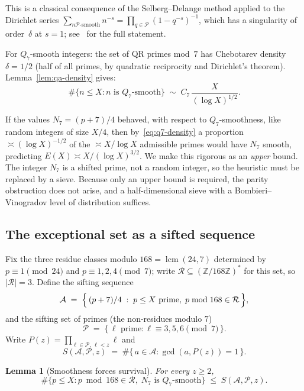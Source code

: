 \documentclass[12pt]{amsart}
\newtheorem{lemma}[theorem]{Lemma}
\theoremstyle{definition}
\theoremstyle{remark}
\begin{document}
This is a classical consequence of the Selberg--Delange method applied
to the Dirichlet series
$\sum_{n \mathcal{P}\text{-smooth}} n^{-s}
= \prod_{q \in \mathcal{P}}(1-q^{-s})^{-1}$,
which has a singularity of order~$\delta$ at $s=1$;
see~\cite[Chapter~II.5]{Tenenbaum} for the full statement.

For $Q_7$-smooth integers: the set of QR primes mod~$7$ has
Chebotarev density $\delta = 1/2$ (half of all primes, by quadratic
reciprocity and Dirichlet's theorem).  Lemma~\ref{lem:qa-density} gives:
\begin{equation}\label{eq:q7-density}
  \#\{n \le X : n \text{ is } Q_7\text{-smooth}\}
  \;\sim\; C_7\,\frac{X}{(\log X)^{1/2}}.
\end{equation}

If the values $N_7 = (p+7)/4$ behaved, with respect to $Q_7$-smoothness,
like random integers of size $X/4$, then by~\eqref{eq:q7-density} a
proportion $\asymp (\log X)^{-1/2}$ of the $\asymp X/\log X$ admissible
primes would have $N_7$ smooth, predicting $E(X) \asymp X/(\log X)^{3/2}$.
We make this rigorous as an \emph{upper} bound. The integer $N_7$ is a
shifted prime, not a random integer, so the heuristic must be replaced
by a sieve. Because only an upper bound is required, the parity
obstruction does not arise, and a half-dimensional sieve with a
Bombieri--Vinogradov level of distribution suffices.

\subsection{The exceptional set as a sifted sequence}

Fix the three residue classes modulo $168 = \operatorname{lcm}(24,7)$
determined by $p \equiv 1 \pmod{24}$ and $p \equiv 1,2,4 \pmod 7$;
write $\mathcal{R} \subseteq (\mathbb{Z}/168\mathbb{Z})^*$ for this set,
so $|\mathcal{R}| = 3$. Define the sifting sequence
\[
  \mathcal{A} \;=\; \Bigl\{\, (p+7)/4 \;:\; p \le X \text{ prime},\;
  p \bmod 168 \in \mathcal{R} \,\Bigr\},
\]
and the sifting set of primes (the non-residues modulo $7$)
\[
  \mathcal{P} \;=\; \bigl\{\, \ell \text{ prime} :
  \ell \equiv 3,5,6 \pmod 7 \,\bigr\}.
\]
Write $P(z) = \prod_{\ell \in \mathcal{P},\, \ell < z} \ell$ and
\[
  S(\mathcal{A}, \mathcal{P}, z)
  \;=\; \#\{\, a \in \mathcal{A} : \gcd(a, P(z)) = 1 \,\}.
\]

\begin{lemma}[Smoothness forces survival]\label{lem:survive}
For every $z \ge 2$,
\[
  \#\{p \le X : p \bmod 168 \in \mathcal{R},\;
  N_7 \text{ is } Q_7\text{-smooth}\}
  \;\le\; S(\mathcal{A}, \mathcal{P}, z).
\]
\end{lemma}
\end{document}
